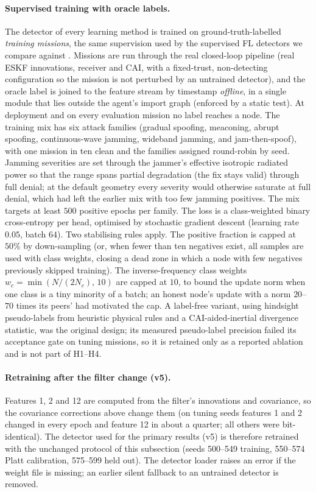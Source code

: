 \documentclass[journal]{IEEEtran}
\begin{document}
\paragraph{Supervised training with oracle labels.}
The detector of every learning method is trained on ground-truth-labelled \emph{training missions}, the
same supervision used by the supervised FL detectors we compare against \cite{khan2025enhancing,chai2025navigation}.
Missions are run through the real closed-loop pipeline (real ESKF innovations, receiver and CAI, with a
fixed-trust, non-detecting configuration so the mission is not perturbed by an untrained detector), and the
oracle label is joined to the feature stream by timestamp \emph{offline}, in a single module that lies
outside the agent's import graph (enforced by a static test). At deployment and on every evaluation
mission no label reaches a node. The training mix has six attack families (gradual spoofing, meaconing,
abrupt spoofing, continuous-wave jamming, wideband jamming, and jam-then-spoof), with one mission in ten
clean and the families assigned round-robin by seed. Jamming severities are set through the jammer's
effective isotropic radiated power so that the range spans partial degradation (the fix stays valid)
through full denial; at the default geometry every severity would otherwise saturate at full denial, which
had left the earlier mix with too few jamming positives. The mix targets at least $500$ positive epochs
per family. The loss is a class-weighted binary cross-entropy per head, optimised by stochastic gradient
descent (learning rate $0.05$, batch $64$). Two stabilising rules apply. The positive fraction is capped
at $50\%$ by down-sampling (or, when fewer than ten negatives exist, all samples are used with class
weights, closing a dead zone in which a node with few negatives previously skipped training). The
inverse-frequency class weights $w_c = \min(N/(2N_c),\,10)$ are capped at $10$, to bound the update norm when one
class is a tiny minority of a batch; an honest node's update with a norm $20$--$70$ times its peers' had motivated the cap. A label-free variant, using hindsight pseudo-labels from heuristic physical rules and a
CAI-aided-inertial divergence statistic, was the original design; its measured pseudo-label precision
failed its acceptance gate on tuning missions, so it is retained only as a reported ablation and is not part
of H1--H4.

\paragraph{Retraining after the filter change (v5).}
Features 1, 2 and 12 are computed from the filter's innovations and covariance, so the covariance corrections above change them
(on tuning seeds features 1 and 2 changed in every epoch and feature 12 in about a quarter; all others were bit-identical).
The detector used for the primary results (v5) is therefore retrained with the unchanged protocol of this subsection (seeds 500--549 training,
550--574 Platt calibration, 575--599 held out). The detector loader raises an error if the weight file is missing; an earlier
silent fallback to an untrained detector is removed.
\end{document}

